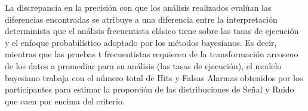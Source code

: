 

La discrepancia en la precisión con que los análisis realizados evalúan las diferencias encontradas se atribuye a una diferencia entre la interpretación determinista que el análisis frecuentista clásico tiene sobre las tasas de ejecución y el enfoque probabilístico adoptado por los métodos bayesianos. Es decir, mientras que las pruebas t frecuentistas requieren de la transformación arcoseno de los datos a promediar para su análisis (las tasas de ejecución), el modelo bayesiano trabaja con el número total de Hits y Falsas Alarmas obtenidos por los participantes para estimar la proporción de las distribuciones de Señal y Ruido que caen por encima del criterio. \\

